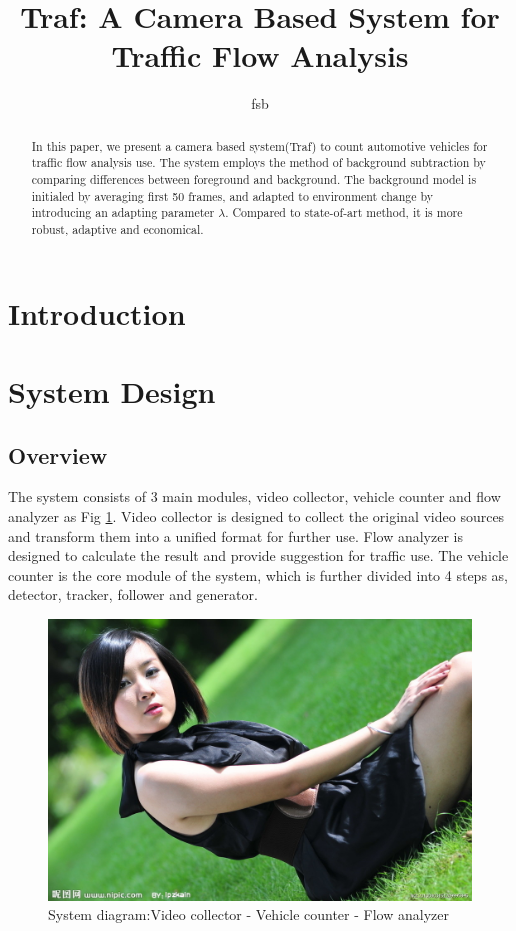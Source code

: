 \documentclass[conference]{IEEEtran}
\begin{document}
\title{Traf: A Camera Based System for Traffic Flow Analysis}
\maketitle
\author{fsb}

\begin{abstract}

In this paper, we present a camera based system(Traf) to count automotive vehicles for traffic flow analysis use. The system employs the method of background subtraction by comparing differences between foreground and background. The background model is initialed by averaging first 50 frames, and adapted to environment change by introducing an adapting parameter $\lambda$. Compared to state-of-art method, it is more robust, adaptive and economical.

\end{abstract}


\section{Introduction}


\section{System Design}
	\subsection{Overview}
	The system consists of 3 main modules, video collector, vehicle counter and flow analyzer as Fig \ref{fig:sysDiagram}. Video collector is designed to collect the original video sources and transform them into a unified format for further use. Flow analyzer is designed to calculate the result and provide suggestion for traffic use. The vehicle counter is the core module of the system, which is further divided into 4 steps as, detector, tracker, follower and generator. 
	
	\begin{figure}[!h]
	\centering
	\includegraphics[width=0.8\linewidth]{figures/lena.jpg} 
	\caption{System diagram:Video collector - Vehicle counter - Flow analyzer}
	\label{fig:sysDiagram}
	\end{figure}
	
\end{document}
